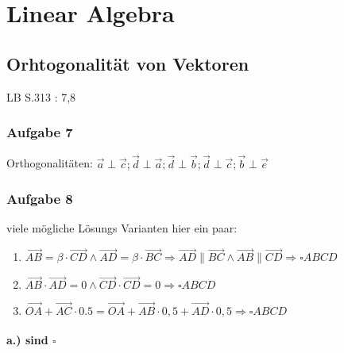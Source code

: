 \documentclass{article}
\begin{document}
\section*{Linear Algebra}

\subsection*{Orhtogonalität von Vektoren}

LB S.313 : 7,8

\subsubsection*{Aufgabe 7}

Orthogonalitäten: \( \overrightarrow{a} \perp \overrightarrow{c} ; \overrightarrow{d} \perp \overrightarrow{a} ; \overrightarrow{d} \perp \overrightarrow{b} ; \overrightarrow{d} \perp \overrightarrow{c} ; \overrightarrow{b} \perp \overrightarrow{e} \)

\subsubsection*{Aufgabe 8}

viele mögliche Lösungs Varianten hier ein paar: 

\begin{enumerate}

	\item \( \overrightarrow{AB} = \beta \cdot \overrightarrow{CD} \wedge \overrightarrow{AD} = \beta \cdot \overrightarrow{BC} \Rightarrow \overrightarrow{AD} \parallel \overrightarrow{BC} \wedge \overrightarrow{AB} \parallel \overrightarrow{CD} \Rightarrow \square ABCD \)
	\item \( \overrightarrow{AB} \cdot \overrightarrow{AD} = 0 \wedge \overrightarrow{CD} \cdot \overrightarrow{CD} = 0 \Rightarrow \square ABCD \)
	\item \( \overrightarrow{OA} + \overrightarrow{AC} \cdot 0.5 = \overrightarrow{OA} + \overrightarrow{AB} \cdot 0,5 + \overrightarrow{AD} \cdot 0,5 \Rightarrow \square ABCD\)
\end{enumerate}

\paragraph*{a.) 
sind \( \square \)} 
\end{document}
